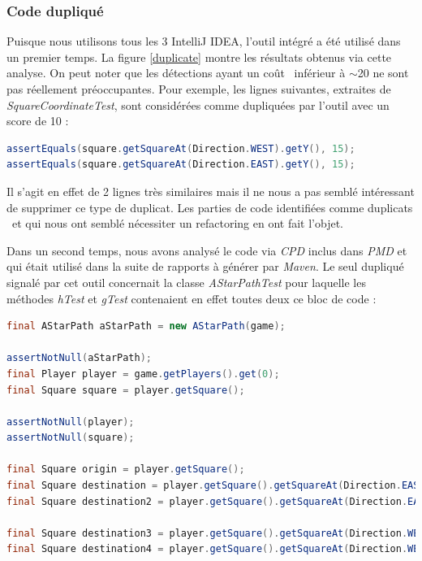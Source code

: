 \documentclass[12pt, openany]{report}
\begin{document}
\subsubsection{Code dupliqué}
Puisque nous utilisons tous les 3 IntelliJ IDEA, l'outil intégré a été utilisé dans un premier temps. La figure \ref{duplicate} montre les résultats obtenus via cette analyse.
On peut noter que les détections ayant un \og coût \fg \, inférieur à $\sim$20 ne sont pas réellement préoccupantes. Pour exemple, les lignes suivantes, extraites de \textit{SquareCoordinateTest}, sont considérées comme dupliquées par l'outil avec un score de 10 :
\begin{lstlisting}[language=java]
assertEquals(square.getSquareAt(Direction.WEST).getY(), 15);
assertEquals(square.getSquareAt(Direction.EAST).getY(), 15);
\end{lstlisting}
Il s'agit en effet de 2 lignes très similaires mais il ne nous a pas semblé intéressant de supprimer ce type de duplicat. 
Les parties de code identifiées comme \og duplicats \fg \, et qui nous ont semblé nécessiter un refactoring en ont fait l'objet.

Dans un second temps, nous avons analysé le code via \textit{CPD} inclus dans \textit{PMD} et qui était utilisé dans la suite de rapports à générer par \textit{Maven}. Le seul dupliqué signalé par cet outil concernait la classe \textit{AStarPathTest} pour laquelle les méthodes \textit{hTest} et \textit{gTest} contenaient en effet toutes deux ce bloc de code :
\begin{lstlisting}[language=java]
final AStarPath aStarPath = new AStarPath(game);

assertNotNull(aStarPath);
final Player player = game.getPlayers().get(0);
final Square square = player.getSquare();

assertNotNull(player);
assertNotNull(square);

final Square origin = player.getSquare();
final Square destination = player.getSquare().getSquareAt(Direction.EAST);
final Square destination2 = player.getSquare().getSquareAt(Direction.EAST).getSquareAt(Direction.EAST);

final Square destination3 = player.getSquare().getSquareAt(Direction.WEST);
final Square destination4 = player.getSquare().getSquareAt(Direction.WEST).getSquareAt(Direction.WEST);
\end{lstlisting}
\end{document}
